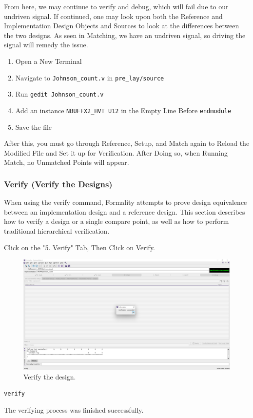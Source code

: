 \documentclass[a4paper,12pt,twoside]{article}
\begin{document}
From here, we may continue to verify and debug, which will fail due to our undriven signal. If continued, one may look upon both the Reference and Implementation Design Objects and Sources to look at the differences between the two designs. As seen in Matching, we have an undriven signal, so driving the signal will remedy the issue.
\begin{enumerate}
    \item Open a New Terminal
    \item Navigate to \texttt{Johnson\_count.v} in \texttt{pre\_lay/source}
    \item Run \texttt{gedit Johnson\_count.v}
    \item Add an instance \texttt{NBUFFX2\_HVT U12} in the Empty Line Before \texttt{endmodule}
    \item Save the file
\end{enumerate}
After this, you must go through Reference, Setup, and Match again to Reload the Modified File and Set it up for Verification. After Doing so, when Running Match, no Unmatched Points will appear.
\subsubsection{Verify (Verify the Designs)}\label{SVerify}
When using the verify command, Formality attempts to prove design equivalence between an implementation design and a reference design. This section describes how to verify a design or a single compare point, as well as how to perform traditional hierarchical verification.

Click on the "5. Verify" Tab, Then Click on Verify.
\begin{figure}[H]
    \centering
    \includegraphics[width=\textwidth]{images/52.png}
    \caption{Verify the design.}
\end{figure}
\begin{verbatim}
verify
\end{verbatim}
The verifying process was finished successfully.
\end{document}
